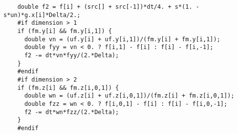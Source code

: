\documentclass[a4paper]{article}
\newcommand{\para}[1]{\textbf{\emph{\textcolor{para}{#1}}}}
\begin{document}
\begin{multicols}{2}
  \columnbreak
  \begin{verbatim}
    double f2 = f[i] + (src[] + src[-1])*dt/4. + s*(1. - s*un)*g.x[i]*Delta/2.;
    #if dimension > 1
    if (fm.y[i] && fm.y[i,1]) {
      double vn = (uf.y[i] + uf.y[i,1])/(fm.y[i] + fm.y[i,1]);
      double fyy = vn < 0. ? f[i,1] - f[i] : f[i] - f[i,-1];
      f2 -= dt*vn*fyy/(2.*Delta);
    }
    #endif
    #if dimension > 2
    if (fm.z[i] && fm.z[i,0,1]) {
      double wn = (uf.z[i] + uf.z[i,0,1])/(fm.z[i] + fm.z[i,0,1]);
      double fzz = wn < 0. ? f[i,0,1] - f[i] : f[i] - f[i,0,-1];
      f2 -= dt*wn*fzz/(2.*Delta);
    }
    #endif
  \end{verbatim}
\end{multicols}

\begin{center}
\end{center}
\end{document}
